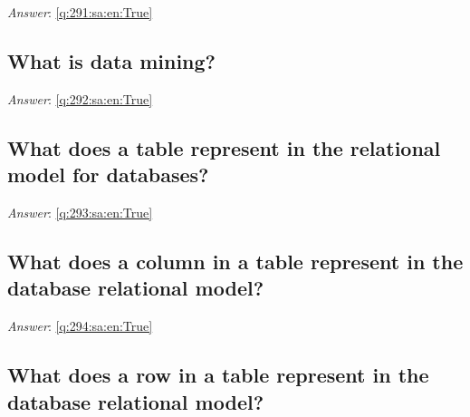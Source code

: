 \documentclass[a4paper,11pt,oneside]{article}
\begin{document}
\begin{sloppypar}
\vspace{1cm}

\textit{Answer}: \autoref{q:291:sa:en:True}



\subsection{What is data mining?}

\label{q:292:sa:en:False}

\vspace{2cm}

\noindent\makebox[\textwidth]{\hrulefill}

\vspace{1cm}

\textit{Answer}: \autoref{q:292:sa:en:True}



\subsection{What does a table represent in the relational model for databases?}

\label{q:293:sa:en:False}

\vspace{2cm}

\noindent\makebox[\textwidth]{\hrulefill}

\vspace{1cm}

\textit{Answer}: \autoref{q:293:sa:en:True}



\subsection{What does a column in a table represent in the database relational model?}

\label{q:294:sa:en:False}

\vspace{2cm}

\noindent\makebox[\textwidth]{\hrulefill}

\vspace{1cm}

\textit{Answer}: \autoref{q:294:sa:en:True}



\subsection{What does a row in a table represent in the database relational model?}


\end{sloppypar}
\end{document}
